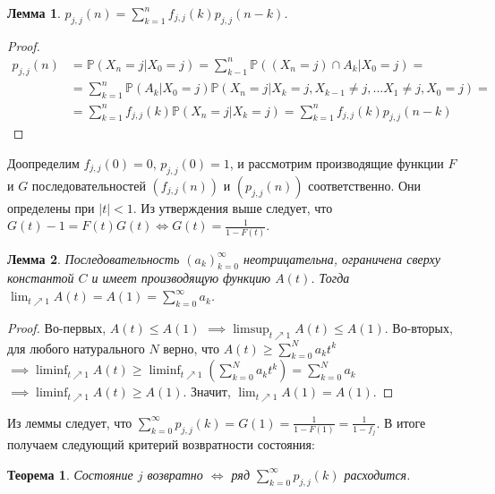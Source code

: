 \documentclass[a4paper,100pt]{article}
\theoremstyle{indented}
\newtheorem{theorem}{Теорема}
\newtheorem{lemma}{Лемма}
\theoremstyle{definition}
\theoremstyle{remark}
\begin{document}
\begin{lemma}
  $p_{j, j}(n)= \sum_{k=1}^n f_{j, j}(k)p_{j, j}(n-k)$.
\end{lemma}

\begin{proof}
  \begin{equation*}
    \begin{aligned}
      p_{j, j}(n)& =\mathbb{P} (X_n=j | X_0=j) = \sum_{k-1}^n \mathbb{P}((X_n=j) \cap A_k | X_0=j) = \\ 
      & = \sum_{k=1}^n \mathbb{P}(A_k | X_0=j) \mathbb{P}(X_n=j | X_k=j, X_{k-1} \neq j, ... X_1 \neq j, X_0=j)=\\ 
      & = \sum_{k=1}^n f_{j, j}(k)\mathbb{P}(X_n=j | X_k=j)=\sum_{k=1}^n f_{j, j}(k)p_{j, j}(n-k)
    \end{aligned}
  \end{equation*}
\end{proof}

Доопределим $f_{j, j}(0)=0$, $p_{j, j}(0)=1$, и рассмотрим производящие функции $F$ и $G$ последовательностей $(f_{j, j}(n))$ и $(p_{j, j}(n))$ соответственно. Они определены при $|t|<1$. Из утверждения выше следует, что $G(t)-1=F(t)G(t) \iff G(t)=\frac{1}{1-F(t)}$. \\

\begin{lemma}
  Последовательность $(a_k)_{k=0}^{\infty}$ неотрицательна, ограничена сверху константой $C$ и имеет производящую функцию $A(t)$. Тогда $\lim_{t \nearrow 1} A(t)=A(1) = \sum_{k=0}^{\infty} a_k$.
\end{lemma}

\begin{proof}
  Во-первых, $A(t) \leq A(1)$ $\implies \limsup_{t \nearrow 1} A(t) \leq A(1)$. Во-вторых, для любого натурального $N$ верно, что $A(t) \geq \sum_{k=0}^{N} a_kt^k$ $\implies \liminf_{t \nearrow 1} A(t) \geq \liminf_{t \nearrow 1} (\sum_{k=0}^{N} a_kt^k)= \sum_{k=0}^{N} a_k$ $\implies \liminf_{t \nearrow 1} A(t) \geq A(1)$. Значит, $\lim_{t \nearrow 1} A(1)=A(1)$.
\end{proof}

Из леммы следует, что $\sum_{k=0}^{\infty} p_{j, j}(k)=G(1)=\frac{1}{1-F(1)}=\frac{1}{1-f_j}$. В итоге получаем следующий критерий возвратности состояния: \\

\begin{theorem}
  Состояние $j$ возвратно $\iff $ ряд $\sum_{k=0}^{\infty} p_{j, j}(k)$ расходится.
\end{theorem}
\end{document}
